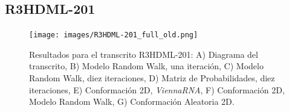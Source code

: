 \documentclass[a4paper,11pt,titlepage]{article}
\theoremstyle{definition}
\begin{document}
\subsection*{R3HDML-201}\label{subsec:gene5}

\begin{figure}[H]
    \centering
    \texttt{[image: images/R3HDML-201\_full\_old.png]}
    \small{\caption{Resultados para el transcrito R3HDML-201: A) Diagrama del transcrito, B) Modelo Random Walk, una iteración, C) Modelo Random Walk, diez iteraciones, D) Matriz de Probabilidades, diez iteraciones, E) Conformación 2D, \textit{ViennaRNA}, F) Conformación 2D, Modelo Random Walk, G) Conformación Aleatoria 2D.}\label{fig:R3HDML-201-diag}}\normalsize
\end{figure}

%
%
\end{document}
